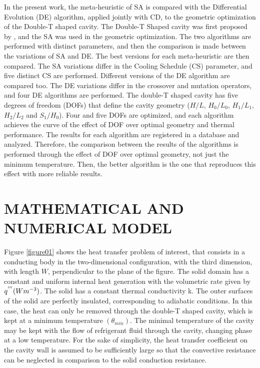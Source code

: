 \documentclass[10pt,fleqn,a4paper,twoside]{article}
\begin{document}
In the present work, the meta-heuristic of SA is compared with the Differential Evolution (DE) algorithm, applied jointly with CD, to the geometric optimization of the Double-T shaped cavity. The Double-T Shaped cavity was first proposed by \cite{Gonzales2015b}, and the SA was used in the geometric optimization. The two algorithms are performed with distinct parameters, and then the comparison is made between the variations of SA and DE. The best versions for each meta-heuristic are then compared. The SA variations differ in the Cooling Schedule (CS) parameter, and five distinct CS are performed. Different versions of the DE algorithm are compared too. The DE variations differ in the crossover and mutation operators, and four DE algorithms are performed. The double-T shaped cavity has five degrees of freedom (DOFs) that define the cavity geometry ($H/L$, $H_{0}/L_{0}$, $H_{1}/L_{1}$, $H_{2}/L_{2}$ and $S_{1}/H_{0}$). Four and five DOFs are optimized, and each algorithm achieves the curve of the effect of DOF over optimal geometry and thermal performance. The results for each algorithm are registered in a database and analyzed. Therefore, the comparison between the results of the algorithms is performed through the effect of DOF over optimal geometry, not just the minimum temperature.  Then, the better algorithm is the one that reproduces this effect with more reliable results.


\section{MATHEMATICAL AND NUMERICAL MODEL}

Figure \ref{figure01} shows the heat transfer problem of interest, that consists in a conducting body in the two-dimensional configuration, with the third dimension, with length $W$, perpendicular to the plane of the figure. The solid domain has a constant and uniform internal heat generation with the volumetric rate given by $q^{'''}(Wm^{\tiny -3})$. The solid has a constant thermal conductivity k. The outer surfaces of the solid are perfectly insulated, corresponding to adiabatic conditions. In this case, the heat can only be removed through the double-T shaped cavity, which is kept at a minimum temperature $(\theta_{min})$. The minimal temperature of the cavity may be kept with the flow of refrigerant fluid through the cavity, changing phase at a low temperature. For the sake of simplicity, the heat transfer coefficient on the cavity wall is assumed to be sufficiently large so that the convective resistance can be neglected in comparison to the solid conduction resistance.
\end{document}
